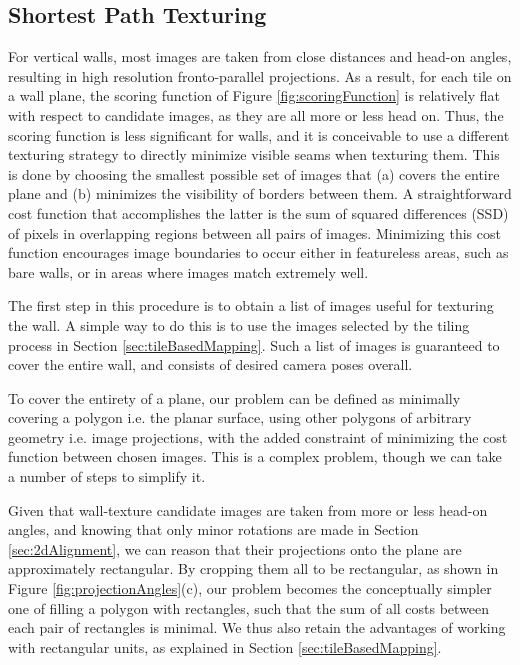 \documentclass[]{spie}  %
\begin{document}
\subsection{Shortest Path Texturing}
\label{sec:shortestPath}
For vertical walls, most images are taken from close distances and
head-on angles, resulting in high resolution fronto-parallel
projections. As a result, for each tile on a wall plane, the scoring
function of Figure \ref{fig:scoringFunction} is relatively flat with
respect to candidate images, as they are all more or less head
on. Thus, the scoring function is less significant for walls, and it
is conceivable to use a different texturing strategy to directly
minimize visible seams when texturing them. This is done by choosing
the smallest possible set of images that (a) covers the entire plane
and (b) minimizes the visibility of borders between them. A
straightforward cost function that accomplishes the latter is the sum
of squared differences (SSD) of pixels in overlapping regions between
all pairs of images. Minimizing this cost function encourages image
boundaries to occur either in featureless areas, such as bare walls,
or in areas where images match extremely well.

The first step in this procedure is to obtain a list of images useful
for texturing the wall. A simple way to do this is to use the images
selected by the tiling process in Section
\ref{sec:tileBasedMapping}. Such a list of images is guaranteed to
cover the entire wall, and consists of desired camera poses overall.

To cover the entirety of a plane, our problem can be defined as
minimally covering a polygon i.e. the planar surface, using other
polygons of arbitrary geometry i.e. image projections, with the added
constraint of minimizing the cost function between chosen images.
This is a complex problem, though we can take a number of steps to
simplify it.

Given that wall-texture candidate images are taken from more or less
head-on angles, and knowing that only minor rotations are made in
Section \ref{sec:2dAlignment}, we can reason that their projections
onto the plane are approximately rectangular. By cropping them all to
be rectangular, as shown in Figure \ref{fig:projectionAngles}(c), our
problem becomes the conceptually simpler one of filling a polygon with
rectangles, such that the sum of all costs between each pair of
rectangles is minimal. We thus also retain the advantages of working
with rectangular units, as explained in Section
\ref{sec:tileBasedMapping}.
\end{document}
